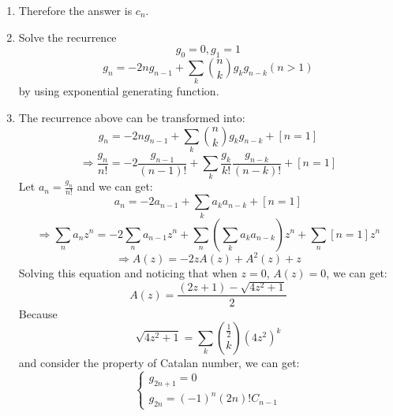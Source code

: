 \documentclass[12pt,a4paper]{article}
\makeatletter
\newtheorem*{solution}{Solution}
\theoremstyle{definition}
\renewenvironment{solution}[1][Solution] {\par\pushQED{\qed}\normalfont\topsep6\p@\@plus6\p@\relax\trivlist\item[\hskip\labelsep\bfseries#1\@addpunct{.}]\ignorespaces}{\popQED\endtrivlist\@endpefalse} \makeatother
\makeatother
\begin{document}
\begin{enumerate}
\begin{solution}
        	Therefore the answer is $c_n$.
        \end{solution}
    \item 
        Solve the recurrence
        \begin{equation*}
            g_0=0,g_1=1
        \end{equation*}
        \begin{equation*}
            g_n=-2ng_{n-1}+\sum_k \binom{n}{k} g_kg_{n-k}(n>1)
        \end{equation*}
        by using exponential generating function.
        \begin{solution}
        	The recurrence above can be transformed into:
        	\begin{equation*}
        	    g_n=-2ng_{n-1}+\sum_k \binom{n}{k} g_kg_{n-k}+[n=1]
        	\end{equation*}
        	\begin{equation*}
        	    \Rightarrow \frac{g_n}{n!}=-2\frac{g_{n-1}}{(n-1)!}+\sum_k \frac{g_k}{k!}\frac{g_{n-k}}{(n-k)!}+[n=1]
        	\end{equation*}
        	Let $a_n=\frac{g_n}{n!}$ and we can get:
        	\begin{equation*}
        	    a_n=-2a_{n-1}+\sum_k a_ka_{n-k}+[n=1]
        	\end{equation*}
        	\begin{equation*}
        	    \Rightarrow \sum_n a_nz^n=-2\sum_n a_{n-1}z^n+\sum_n (\sum_k a_ka_{n-k})z^n+\sum_n [n=1]z^n
        	\end{equation*}
        	\begin{equation*}
        	    \Rightarrow A(z)=-2zA(z)+A^2(z)+z
        	\end{equation*}
        	Solving this equation and noticing that when $z=0$, $A(z)=0$, we can get:
        	\begin{equation*}
        	    A(z)=\frac{(2z+1)-\sqrt{4z^2+1}}{2}
        	\end{equation*}
        	Because 
        	\begin{equation*}
        	    \sqrt{4z^2+1}=\sum_k \binom{\frac{1}{2}}{k}(4z^2)^k
        	\end{equation*}
        	and consider the property of Catalan number, we can get:
        	\begin{equation*}
        	    \begin{cases}
        	        g_{2n+1}=0\\
        	        g_{2n}=(-1)^n(2n)!C_{n-1}
        	    \end{cases}

\end{equation*}
\end{solution}
\end{enumerate}
\end{document}
